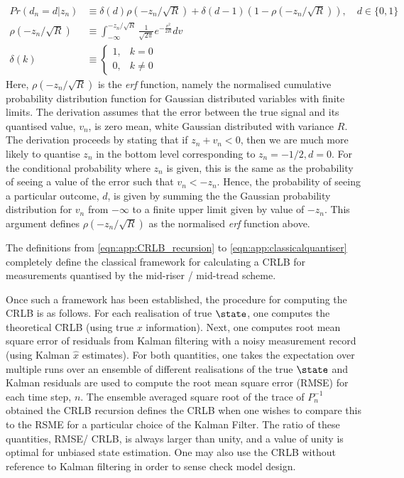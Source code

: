 \begin{align}
Pr(d_n=d| z_n) & \equiv \delta(d) \rho(-z_n/ \sqrt{R}) + \delta(d-1) (1- \rho(-z_n/ \sqrt{R})), \quad d \in \{0,1\} \label{eqn:app:classicalquantiser}\\
\rho(-z_n/ \sqrt{R}) & \equiv \int_{-\infty}^{-z_n/ \sqrt{R}} \frac{1}{\sqrt{2\pi}} e^{-\frac{v^2}{2 R}} dv \\
\delta(k) &\equiv \begin{cases} 1, &k=0 \\ 0, &k \neq 0 \end{cases}
\end{align}
Here, $\rho(-z_n/ \sqrt{R})$ is the \emph{erf} function, namely the normalised cumulative probability distribution function for Gaussian distributed variables with finite limits. The derivation assumes that the error  between the true signal and its quantised value, $v_n$, is zero mean, white Gaussian distributed with variance $R$. The derivation proceeds by stating that if $z_n + v_n < 0$, then we are much more likely to quantise $z_n$ in the bottom level corresponding to $z_n = -1/2, d= 0$. For the conditional probability where $z_n$ is given, this is the same as the probability of seeing a value of the error such that $v_n < -z_n$.  Hence, the probability of seeing a particular outcome, $d$, is given by summing the the Gaussian probability distribution for $v_n$ from $-\infty$ to a finite upper limit given by value of $-z_n$. This argument defines $\rho(-z_n/ \sqrt{R})$ as the normalised \emph{erf} function above.

The definitions from \cref{eqn:app:CRLB_recursion} to \cref{eqn:app:classicalquantiser} completely define the classical framework for calculating a CRLB for measurements quantised by the mid-riser / mid-tread scheme.

Once such a framework has been established, the procedure for computing the CRLB is as follows. For each realisation of true $\state$, one computes the theoretical CRLB (using true $x$ information).  Next, one computes root mean square error of residuals from Kalman filtering with a noisy measurement record (using Kalman $\hat{x}$ estimates). For both quantities, one takes the expectation over multiple runs over an ensemble of different realisations of the true $\state$ and Kalman residuals are used to compute the root mean square error (RMSE) for each time step, $n$. The ensemble averaged square root of the trace of $P_n^{-1}$ obtained the CRLB recursion defines the CRLB when one wishes to compare this to the RSME for a particular choice of the Kalman Filter. The ratio of these quantities, RMSE/ CRLB, is always larger than unity, and a value of unity is optimal for unbiased state estimation. One may also use the CRLB without reference to Kalman filtering in order to sense check model design. 

